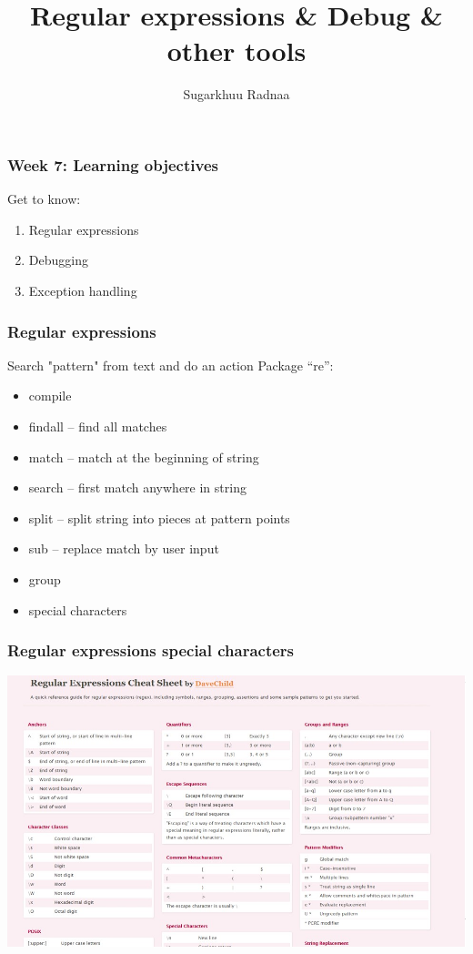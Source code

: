 \documentclass{beamer}
\title[Introduction to Python]{Regular expressions \& Debug \& other tools}
\author{Sugarkhuu Radnaa}
\institute[]
{
Py4Econ in Ulaanbaatar \\ 
\medskip
\textit{py4econ@gmail.com} 
}
\date{}  %
\begin{document}
\begin{frame}
\titlepage %
\end{frame}

\begin{frame}
    \frametitle{Week 7: Learning objectives}
    Get to know: 
    \begin{enumerate}
            \item Regular expressions
            \item Debugging
            \item Exception handling         
    \end{enumerate}
\end{frame}


\begin{frame}
    \frametitle{Regular expressions}
Search "pattern"  from text and do an action
Package “re”:
    \begin{itemize}
        \item compile
        \item findall – find all matches
        \item match – match at the beginning of string
        \item search – first match anywhere in string
        \item split – split string into pieces at pattern points
        \item sub – replace match by user input
        \item group 
        \item special characters
    \end{itemize}
\end{frame}

\begin{frame}
    \frametitle{Regular expressions special characters}
            \centering
            \includegraphics[scale=0.5]{figures/regex.jpg}
\end{frame}
\end{document}

